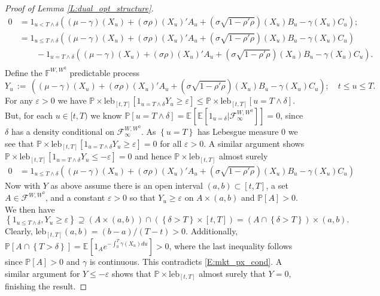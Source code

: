 \documentclass[11pt, letterpaper]{amsart}
\theoremstyle{definition}
\theoremstyle{remark}
\numberwithin{equation}{section}
\newcommand{\eps}{\varepsilon}
\newcommand{\prob}{\mathbb{P}}
\newcommand{\esp}{\mathbb{E}}
\newcommand{\espalt}[2]{\esp^{#1}\bra{#2}}
\newcommand{\F}{\mathcal{F}}
\newcommand{\filt}{\mathbb{F}}
\newcommand{\condespalt}[3]{\esp^{#1}\bra{#2\big| #3}}
\newcommand{\dfn}{\, := \,}
\newcommand{\bra}[1]{\left[#1\right]}
\newcommand{\cbra}[1]{\left\{#1\right\}}
\begin{document}
\begin{proof}[Proof of Lemma \ref{L:dual_opt_structure}]
\begin{equation*}
\begin{split}
0 &= 1_{u <  T\wedge\delta}\left((\mu-\gamma)(X_u) + (\sigma\rho)(X_u)'A_u + (\sigma\sqrt{1-\rho'\rho})(X_u)B_u - \gamma(X_u)C_u\right);\\
&= 1_{u \leq  T\wedge\delta}\left((\mu-\gamma)(X_u) + (\sigma\rho)(X_u)'A_u + (\sigma\sqrt{1-\rho'\rho})(X_u)B_u - \gamma(X_u)C_u\right)\\
&\qquad - 1_{u =  T\wedge\delta}\left((\mu-\gamma)(X_u) + (\sigma\rho)(X_u)'A_u + (\sigma\sqrt{1-\rho'\rho})(X_u)B_u - \gamma(X_u)C_u\right).\\
\end{split}
\end{equation*}
Define the $\filt^{W,W^0}$ predictable process
\begin{equation*}
Y_u \dfn \left((\mu-\gamma)(X_u) + (\sigma\rho)(X_u)'A_u + (\sigma\sqrt{1-\rho'\rho})(X_u)B_u - \gamma(X_u)C_u\right);\quad t\leq u\leq T.
\end{equation*}
For any $\eps>0$ we have $\prob\times\textrm{leb}_{[t,T]}\bra{1_{u=T\wedge\delta}Y_u \geq \eps} \leq \prob\times\textrm{leb}_{[t,T]}\bra{u=T\wedge\delta}$. But, for each $u\in [t,T)$ we know $\prob\bra{u=T\wedge\delta} = \espalt{}{\condespalt{}{1_{u=\delta}}{\F^{W,W^0}_\infty}} =0$, since $\delta$ has a density conditional on $\F^{W,W^0}_\infty$.  As $\cbra{u=T}$ has Lebesgue measure $0$ we see that $\prob\times\textrm{leb}_{[t,T]}\bra{1_{u=T\wedge\delta}Y_u \geq \eps} = 0$ for all $\eps>0$.  A similar argument shows $\prob\times\textrm{leb}_{[t,T]}\bra{1_{u=T\wedge\delta}Y_u \leq -\eps} = 0$ and hence $\prob\times\textrm{leb}_{[t,T]}$ almost surely
\begin{equation}\label{E:mkt_px_cond}
\begin{split}
0 &= 1_{u \leq  T\wedge\delta}\left((\mu-\gamma)(X_u) + (\sigma\rho)(X_u)'A_u + (\sigma\sqrt{1-\rho'\rho})(X_u)B_u - \gamma(X_u)C_u\right)
\end{split}
\end{equation}
Now with $Y$ as above assume there is an open interval $(a,b)\subset [t,T]$, a set $A\in\F^{W,W^0}$, and a constant $\eps > 0$ so that $Y_u\geq \eps$ on $A\times(a,b)$ and $\prob\bra{A} > 0$. We then have
\begin{equation*}
\cbra{1_{u\leq T\wedge\delta}, Y_u\geq \eps} \supseteq (A\times (a,b)) \cap (\cbra{\delta>T}\times [t,T]) = (A\cap\cbra{\delta > T})\times (a,b).
\end{equation*}
Clearly, $\textrm{leb}_{[t,T]}(a,b) = (b-a)/(T-t) > 0$.  Additionally, $\prob\bra{A\cap\cbra{T>\delta}} = \espalt{}{1_A e^{-\int_0^T \gamma(X_u)du}} > 0$, where the last inequality follows since $\prob\bra{A}>0$ and $\gamma$ is continuous.  This contradicts \eqref{E:mkt_px_cond}.  A similar argument for $Y\leq -\eps$ shows that $\prob\times\textrm{leb}_{[t,T]}$ almost surely that $Y = 0$, finishing the result.
\end{proof}
\end{document}
